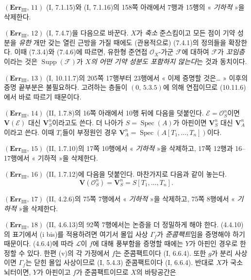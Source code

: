 \noindent\textbf{$(\mathbf{Err}_{\mathrm{III}},\,11)$}
(I, 7.1.15)와 (I, 7.1.16)의 158쪽 아래에서 7행과 15행의
« \emph{기하적} »을 삭제한다.

\noindent\textbf{$(\mathbf{Err}_{\mathrm{III}},\,12)$}
(I, 7.4.7)을 다음으로 바꾼다. $X$가 \emph{축소} 준스킴이고 모든 점이
기약 성분을 \emph{유한} 개만 갖는 열린 근방을 가질 때에도
(관용적으로) (7.4.1)의 정의들을 확장한다. 이때 (7.3.4)와 (7.4.6)에
따르면, 유한형 준연접 $\mathscr O_X$-가군 $\mathscr F$에 대하여
$\mathscr F$가 \emph{꼬임층}이라는 것은
$\operatorname{Supp}(\mathscr F)$가 \emph{$X$의 어떤 기약 성분도
포함하지 않는다}는 것과 동치이다.

\noindent\textbf{$(\mathbf{Err}_{\mathrm{III}},\,13)$}
(I, 10.11.7)의 205쪽 17행부터 23행에서 « 이제 증명할 것은\ldots{} »
이후의 증명 끝부분은 불필요하다. 고려하는 층들이 $(0,\,5.3.5)$에 의해
연접이므로 (10.11.6)에서 바로 따르기 때문이다.

\noindent\textbf{$(\mathbf{Err}_{\mathrm{III}},\,14)$}
(II, 1.7.8)의 16쪽 아래에서 10행 뒤에 다음을 덧붙인다.
$\mathscr E=\mathscr O_S^n$이면 $\mathbf V(\mathscr E)$ 대신
$\mathbf V_S^n$이라고도 쓴다. 더 나아가 $S=\operatorname{Spec}(A)$가
아핀이면 $\mathbf V_S^n$ 대신 $\mathbf V_A^n$이라고 쓴다. 이때
$T_i$들이 부정원인 경우
$\mathbf V_A^n=\operatorname{Spec}(A[T_1,\ldots,T_n])$이다.

\noindent\textbf{$(\mathbf{Err}_{\mathrm{III}},\,15)$}
(II, 1.7.10)의 17쪽 10행에서 « \emph{기하적} »을 삭제하고,
17쪽 12행과 16--17행에서 « 기하적 »을 삭제한다.

\noindent\textbf{$(\mathbf{Err}_{\mathrm{III}},\,16)$}
(II, 1.7.12)에 다음을 덧붙인다. 마찬가지로 다음과 같이 놓는다.
\[
  \mathbf V(\mathscr O_S^n)=\mathbf V_S^n=S[T_1,\ldots,T_n].
\]

\noindent\textbf{$(\mathbf{Err}_{\mathrm{III}},\,17)$}
(II, 4.2.6)의 75쪽 7행에서 « \emph{기하적} »을 삭제하고,
75쪽 8행에서 « \emph{기하적} »을 삭제한다.

\noindent\textbf{$(\mathbf{Err}_{\mathrm{III}},\,18)$}
(II, 4.6.13)의 92쪽 7행에서는 논증을 더 정밀하게 해야 한다. (4.4.10)의
표기에서 (i bis)를 적용하려면 여기서 몰입 사상 $\Gamma_f$가
\emph{준콤팩트}임을 증명해야 하기 때문이다. (4.6.4)에 따라
$\mathscr L$이 $f$에 대해 풍부함을 증명할 때에는 $Y$가 아핀인 경우로
한정할 수 있다. 한편 (v)의 각 가정에서 $f$는 준콤팩트이다
(I, 6.6.4). 또한 $g$가 분리 사상이면 $\Gamma_f$는 닫힌 몰입
사상이므로 (I, 5.4.3) 준콤팩트이다 (I, 6.6.4). 반대로 $X$가 국소
뇌터이면, $Y$가 아핀이고 $f$가 준콤팩트이므로 $X$의 바탕공간은

